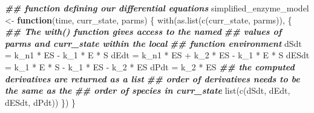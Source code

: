 \documentclass[
]{article}
\newenvironment{Shaded}{\begin{snugshade}}{\end{snugshade}}
\newcommand{\ControlFlowTok}[1]{\textcolor[rgb]{0.13,0.29,0.53}{\textbf{#1}}}
\newcommand{\DocumentationTok}[1]{\textcolor[rgb]{0.56,0.35,0.01}{\textbf{\textit{#1}}}}
\newcommand{\FunctionTok}[1]{\textcolor[rgb]{0.00,0.00,0.00}{#1}}
\newcommand{\NormalTok}[1]{#1}
\newcommand{\OtherTok}[1]{\textcolor[rgb]{0.56,0.35,0.01}{#1}}
\newcommand{\SpecialCharTok}[1]{\textcolor[rgb]{0.00,0.00,0.00}{#1}}
\begin{document}
\begin{Shaded}
\begin{Highlighting}[]
\DocumentationTok{\#\# function defining our differential equations}
\NormalTok{simplified\_enzyme\_model }\OtherTok{\textless{}{-}} \ControlFlowTok{function}\NormalTok{(time, curr\_state, }
\NormalTok{    parms) \{}
    \FunctionTok{with}\NormalTok{(}\FunctionTok{as.list}\NormalTok{(}\FunctionTok{c}\NormalTok{(curr\_state, parms)), \{}
        \DocumentationTok{\#\# The with() function gives access to the named}
        \DocumentationTok{\#\# values of parms and curr\_state within the local}
        \DocumentationTok{\#\# function environment}
\NormalTok{        dSdt }\OtherTok{=}\NormalTok{ k\_n1 }\SpecialCharTok{*}\NormalTok{ ES }\SpecialCharTok{{-}}\NormalTok{ k\_1 }\SpecialCharTok{*}\NormalTok{ E }\SpecialCharTok{*}\NormalTok{ S}
\NormalTok{        dEdt }\OtherTok{=}\NormalTok{ k\_n1 }\SpecialCharTok{*}\NormalTok{ ES }\SpecialCharTok{+}\NormalTok{ k\_2 }\SpecialCharTok{*}\NormalTok{ ES }\SpecialCharTok{{-}}\NormalTok{ k\_1 }\SpecialCharTok{*}\NormalTok{ E }\SpecialCharTok{*}\NormalTok{ S}
\NormalTok{        dESdt }\OtherTok{=}\NormalTok{ k\_1 }\SpecialCharTok{*}\NormalTok{ E }\SpecialCharTok{*}\NormalTok{ S }\SpecialCharTok{{-}}\NormalTok{ k\_1 }\SpecialCharTok{*}\NormalTok{ ES }\SpecialCharTok{{-}}\NormalTok{ k\_2 }\SpecialCharTok{*}\NormalTok{ ES}
\NormalTok{        dPdt }\OtherTok{=}\NormalTok{ k\_2 }\SpecialCharTok{*}\NormalTok{ ES}
        \DocumentationTok{\#\# the computed derivatives are returned as a list}
        \DocumentationTok{\#\# order of derivatives needs to be the same as the}
        \DocumentationTok{\#\# order of species in curr\_state}
        \FunctionTok{list}\NormalTok{(}\FunctionTok{c}\NormalTok{(dSdt, dEdt, dESdt, dPdt))}
\NormalTok{    \})}
\NormalTok{\}}
\end{Highlighting}
\end{Shaded}
\end{document}
